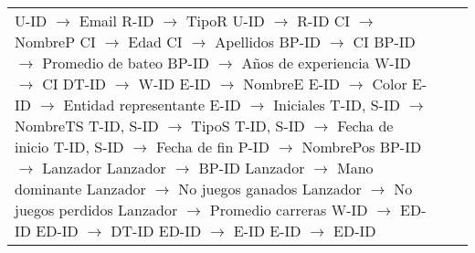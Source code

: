 \documentclass{report}
\begin{document}
\begin{tabularx}{\textwidth}{|X|X|X|}
        U-ID $\rightarrow$ Email \newline 
        R-ID $\rightarrow$ TipoR \newline 
        U-ID $\rightarrow$ R-ID \newline 
        CI $\rightarrow$ NombreP \newline 
        CI $\rightarrow$ Edad \newline 
        CI $\rightarrow$ Apellidos \newline 
        BP-ID $\rightarrow$ CI \newline 
        BP-ID $\rightarrow$ Promedio de bateo \newline 
        BP-ID $\rightarrow$ Años de experiencia \newline 
        W-ID $\rightarrow$ CI \newline 
        DT-ID $\rightarrow$ W-ID \newline 
        E-ID $\rightarrow$ NombreE \newline 
        E-ID $\rightarrow$ Color \newline 
        E-ID $\rightarrow$ Entidad representante \newline 
        E-ID $\rightarrow$ Iniciales \newline 
        T-ID, S-ID $\rightarrow$ NombreTS \newline 
        T-ID, S-ID $\rightarrow$ TipoS \newline 
        T-ID, S-ID $\rightarrow$ Fecha de inicio \newline 
        T-ID, S-ID $\rightarrow$ Fecha de fin \newline 
        P-ID $\rightarrow$ NombrePos \newline 
        BP-ID $\rightarrow$ Lanzador \newline 
        Lanzador $\rightarrow$ BP-ID \newline 
        Lanzador $\rightarrow$ Mano dominante \newline 
        Lanzador $\rightarrow$ No juegos ganados \newline 
        Lanzador $\rightarrow$ No juegos perdidos \newline 
        Lanzador $\rightarrow$ Promedio carreras \newline 
        W-ID $\rightarrow$ ED-ID \newline 
        ED-ID $\rightarrow$ DT-ID \newline 
        ED-ID $\rightarrow$ E-ID \newline 
        E-ID $\rightarrow$ ED-ID \newline 

\end{tabularx}
\end{document}
